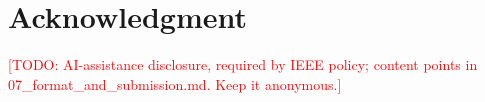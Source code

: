 \documentclass[conference,10pt]{IEEEtran}
\newcommand{\todo}[1]{\textcolor{red}{[TODO: #1]}}
\begin{document}
\section*{Acknowledgment}
\todo{AI-assistance disclosure, required by IEEE policy; content points in 07\_format\_and\_submission.md. Keep it anonymous.}

\nocite{*}


\end{document}
